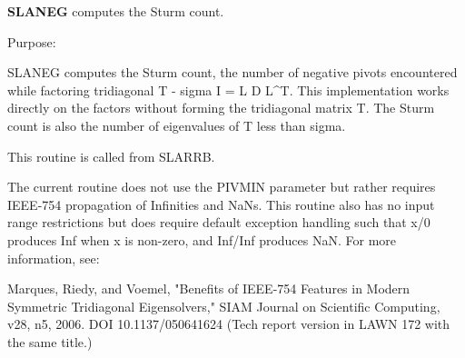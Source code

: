 {\bfseries S\+L\+A\+N\+E\+G} computes the Sturm count. 

 \begin{DoxyParagraph}{Purpose\+: }
\begin{DoxyVerb} SLANEG computes the Sturm count, the number of negative pivots
 encountered while factoring tridiagonal T - sigma I = L D L^T.
 This implementation works directly on the factors without forming
 the tridiagonal matrix T.  The Sturm count is also the number of
 eigenvalues of T less than sigma.

 This routine is called from SLARRB.

 The current routine does not use the PIVMIN parameter but rather
 requires IEEE-754 propagation of Infinities and NaNs.  This
 routine also has no input range restrictions but does require
 default exception handling such that x/0 produces Inf when x is
 non-zero, and Inf/Inf produces NaN.  For more information, see:

   Marques, Riedy, and Voemel, "Benefits of IEEE-754 Features in
   Modern Symmetric Tridiagonal Eigensolvers," SIAM Journal on
   Scientific Computing, v28, n5, 2006.  DOI 10.1137/050641624
   (Tech report version in LAWN 172 with the same title.)\end{DoxyVerb}
 
\end{DoxyParagraph}

